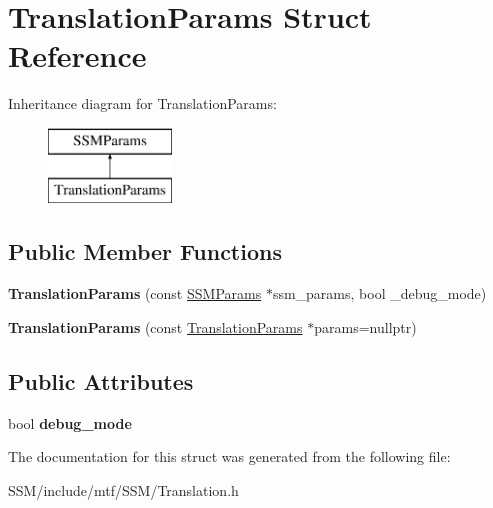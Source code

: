 \hypertarget{structTranslationParams}{\section{Translation\-Params Struct Reference}
\label{structTranslationParams}
}
Inheritance diagram for Translation\-Params\-:\begin{figure}[H]
\begin{center}
\leavevmode
\includegraphics[height=2.000000cm]{structTranslationParams}
\end{center}
\end{figure}
\subsection*{Public Member Functions}
\begin{DoxyCompactItemize}
\item 
\hypertarget{structTranslationParams_a17c797fb0f0757f3c405e40e56807f2a}{{\bfseries Translation\-Params} (const \hyperlink{structSSMParams}{S\-S\-M\-Params} $\ast$ssm\-\_\-params, bool \-\_\-debug\-\_\-mode)}\label{structTranslationParams_a17c797fb0f0757f3c405e40e56807f2a}

\item 
\hypertarget{structTranslationParams_a86fe879e3d8c9a8bb54bce54a961edbc}{{\bfseries Translation\-Params} (const \hyperlink{structTranslationParams}{Translation\-Params} $\ast$params=nullptr)}\label{structTranslationParams_a86fe879e3d8c9a8bb54bce54a961edbc}

\end{DoxyCompactItemize}
\subsection*{Public Attributes}
\begin{DoxyCompactItemize}
\item 
\hypertarget{structTranslationParams_a8781d74b8f894d8d35dc04bcd428996e}{bool {\bfseries debug\-\_\-mode}}\label{structTranslationParams_a8781d74b8f894d8d35dc04bcd428996e}

\end{DoxyCompactItemize}


The documentation for this struct was generated from the following file\-:\begin{DoxyCompactItemize}
\item 
S\-S\-M/include/mtf/\-S\-S\-M/Translation.\-h\end{DoxyCompactItemize}
